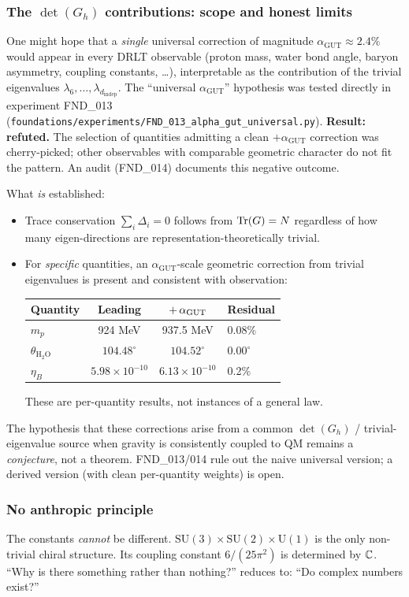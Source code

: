 \subsubsection{The $\det(G_h)$ contributions: scope and honest limits}

One might hope that a \emph{single} universal correction of magnitude $\alpha_{\mathrm{GUT}}\approx 2.4\%$ would appear in every DRLT observable (proton mass, water bond angle, baryon asymmetry, coupling constants, \ldots), interpretable as the contribution of the trivial eigenvalues $\lambda_6,\ldots,\lambda_{d_\text{indep}}$.  The ``universal $\alpha_{\mathrm{GUT}}$'' hypothesis was tested directly in experiment FND\_013 (\texttt{foundations/experiments/FND\_013\_alpha\_gut\_universal.py}).  \textbf{Result: refuted.}  The selection of quantities admitting a clean $+\alpha_{\mathrm{GUT}}$ correction was cherry-picked; other observables with comparable geometric character do not fit the pattern.  An audit (FND\_014) documents this negative outcome.

What \emph{is} established:
\begin{itemize}
\item Trace conservation $\sum_i \Delta_i = 0$ follows from $\operatorname{Tr}(G) = N$ regardless of how many eigen-directions are representation-theoretically trivial.
\item For \emph{specific} quantities, an $\alpha_{\mathrm{GUT}}$-scale geometric correction from trivial eigenvalues is present and consistent with observation:
\begin{center}
\begin{tabular}{lccl}
\hline
Quantity & Leading & $+\,\alpha_{\mathrm{GUT}}$ & Residual \\
\hline
$m_p$ & 924 MeV & 937.5 MeV & 0.08\% \\
$\theta_{\text{H}_2\text{O}}$ & $104.48^\circ$ & $104.52^\circ$ & $0.00^\circ$ \\
$\eta_B$ & $5.98 \times 10^{-10}$ & $6.13 \times 10^{-10}$ & 0.2\% \\
\hline
\end{tabular}
\end{center}
These are per-quantity results, not instances of a general law.
\end{itemize}

\begin{remark}
The hypothesis that these corrections arise from a common $\det(G_h)$ / trivial-eigenvalue source when gravity is consistently coupled to QM remains a \emph{conjecture}, not a theorem.  FND\_013/014 rule out the naive universal version; a derived version (with clean per-quantity weights) is open.
\end{remark}

\subsubsection{No anthropic principle}

The constants \emph{cannot} be different. $\text{SU}(3)\times\text{SU}(2)\times\text{U}(1)$ is the only non-trivial chiral structure. Its coupling constant $6/(25\pi^2)$ is determined by $\mathbb{C}$. ``Why is there something rather than nothing?'' reduces to: ``Do complex numbers exist?''
